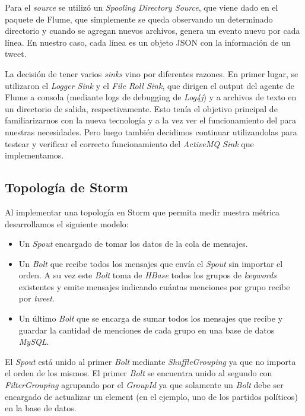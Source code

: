 \documentclass[a4paper,10pt]{article}
\begin{document}
Para el \textit{source} se utilizó un \textit{Spooling Directory Source}, que viene dado en el paquete de Flume, que simplemente se queda observando un
determinado directorio y cuando se agregan nuevos archivos, genera un evento nuevo por cada línea. En nuestro caso, cada línea es un objeto JSON con la información de un tweet.

La decisión de tener varios \textit{sinks} vino por diferentes razones. En primer lugar, se utilizaron el \textit{Logger Sink} y el \textit{File Roll Sink}, que dirigen el output
del agente de Flume a consola (mediante logs de debugging de \textit{Log4j}) y a archivos de texto en un directorio de salida, respectivamente. Esto tenía el objetivo principal de
familiarizarnos con la nueva tecnología y a la vez ver el funcionamiento del  para nuestras necesidades. Pero luego también decidimos continuar
utilizandolas para testear y verificar el correcto funcionamiento del \textit{ActiveMQ Sink} que implementamos.

\subsection{Topología de Storm}

Al implementar una topología en Storm que permita medir nuestra métrica desarrollamos el siguiente modelo:
\begin{itemize}
  \item Un \textit{Spout} encargado de tomar los datos de la cola de mensajes.
  \item Un \textit{Bolt} que recibe todos los mensajes que envía el \textit{Spout} sin importar el orden.
		A su vez este \textit{Bolt} toma de \textit{HBase} todos los grupos de \textit{keywords} existentes y emite mensajes
		indicando cuántas menciones por grupo recibe por \textit{tweet}.
  \item Un último \textit{Bolt} que se encarga de sumar todos los mensajes que recibe y guardar la cantidad de menciones de cada grupo en una base de datos \textit{MySQL}.
\end{itemize}

El \textit{Spout} está unido al primer \textit{Bolt} mediante \textit{ShuffleGrouping} ya que no importa el orden de los mismos.
El primer \textit{Bolt} se encuentra unido al segundo con \textit{FilterGrouping} agrupando por el \textit{GroupId} ya que solamente un
\textit{Bolt} debe ser encargado de actualizar un element (en el ejemplo, uno de los partidos políticos) en la base de datos.
\end{document}
